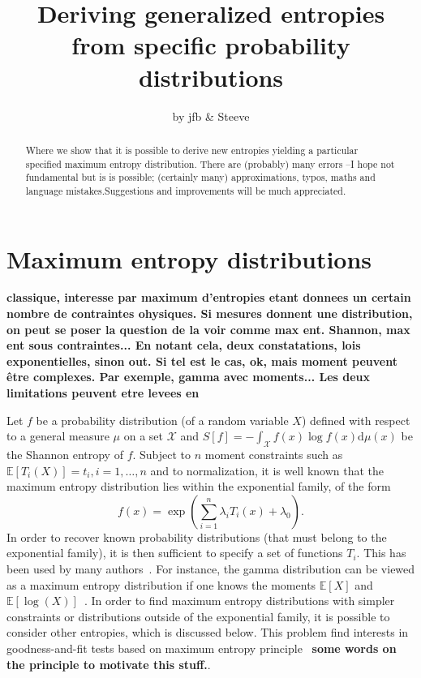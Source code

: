 \documentclass[english,sort&compress]{elsarticle}
\theoremstyle{definition}
\theoremstyle{plain}
\theoremstyle{plain}
\def\dmu{\mathrm{d}\mu}
\def\X{\mathcal{X}}
\newcommand{\Esp}[1]{\mathbb{E}\left[ #1 \right]}
\begin{document}

\title{Deriving generalized entropies from specific probability distributions}
\author{by jfb \& Steeve \date{} }
\begin{abstract}
  Where  we  show  that it  is  possible  to  derive  new entropies  yielding  a
  particular specified  maximum entropy distribution. There  are (probably) many
  errors  --I  hope  not  fundamental  but  is  is  possible;  (certainly  many)
  approximations,   typos,   maths   and   language   mistakes.Suggestions   and
  improvements will be much appreciated.
\end{abstract}

\maketitle



\section{Maximum entropy distributions}
\label{sec:MaxEnt}

{\bf classique, interesse par maximum d'entropies etant donnees un certain nombre de contraintes ohysiques. Si mesures donnent une distribution, on peut se poser la question de la voir comme max ent. Shannon, max ent sous contraintes... En notant cela, deux constatations, lois exponentielles, sinon out. Si tel est le cas, ok, mais moment peuvent être complexes. Par exemple, gamma avec moments... Les deux limitations peuvent etre levees en }

Let $f$  be a probability distribution  (of a random variable  $X$) defined with
respect to  a general measure $\mu$  on a set  $\X$ and $\displaystyle S[f]  = -
\int_\X f(x) \log  f(x) \dmu(x)$ be the Shannon entropy of  $f$.  Subject to $n$
moment constraints  such as  $\Esp{T_i(X)} = t_i,  i =  1 , \ldots  , n$  and to
normalization,  it is  well known  that  the maximum  entropy distribution  lies
within the exponential family, of the form
%
\[
f(x) = \exp\left( \sum_{i=1}^n \lambda_i T_i(x) + \lambda_0 \right).
\]
%
In order  to recover  known probability distributions  (that must belong  to the
exponential family), it is then sufficient  to specify a set of functions $T_i$.
This has been used by  many authors~\cite{toto, Kap89, CovTho06}.  For instance,
the gamma  distribution can be viewed  as a maximum entropy  distribution if one
knows the moments $\Esp  X$ and $\Esp{\log(X)}$~\cite{Kap89, CovTho06, ParBer09,
  Gok75, Gok83}.   In order to  find maximum entropy distributions  with simpler
constraints or distributions  outside of the exponential family,  it is possible
to  consider  other entropies,  which  is  discussed  below. This  problem  find
interests    in    goodness-and-fit    tests    based   on    maximum    entropy
principle~\cite{Vas76, Gok83,  Girardin} {\bf\large some words  on the principle
  to motivate this stuff.}.
\end{document}
